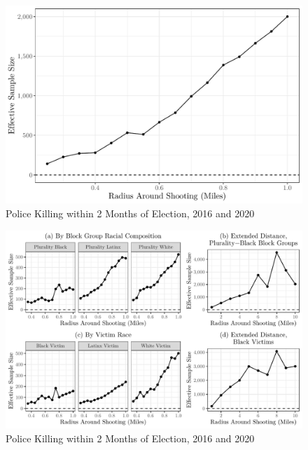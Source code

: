 \documentclass[
  12pt,
]{article}
\begin{document}
\begin{figure}[h]

{\centering \includegraphics{shoot_to_files/figure-latex/samples-1} 

}

\caption{\label{fig:map}Police Killing within 2 Months of Election, 2016 and 2020}\label{fig:samples}
\end{figure}

\begin{figure}[h]

{\centering \includegraphics{shoot_to_files/figure-latex/samples-bo-1} 

}

\caption{\label{fig:map}Police Killing within 2 Months of Election, 2016 and 2020}\label{fig:samples-bo}
\end{figure}
\end{document}
